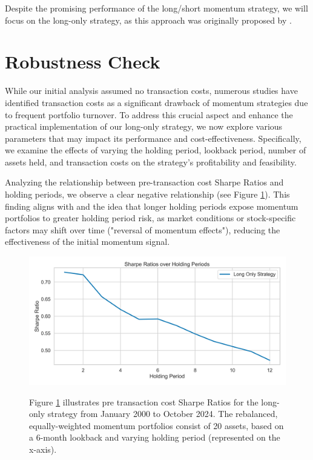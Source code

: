 \documentclass[a4paper,12pt]{article}
\begin{document}
Despite the promising performance of the long/short momentum strategy, we will focus on the long-only strategy, as this approach was originally proposed by \cite{jegatit1993}. 

\newpage


\section{Robustness Check}
While our initial analysis assumed no transaction costs, numerous studies have identified transaction costs as a significant drawback of momentum strategies due to frequent portfolio turnover. To address this crucial aspect and enhance the practical implementation of our long-only strategy, we now explore various parameters that may impact its performance and cost-effectiveness. Specifically, we examine the effects of varying the holding period, lookback period, number of assets held, and transaction costs on the strategy's profitability and feasibility.

Analyzing the relationship between pre-transaction cost Sharpe Ratios and holding periods, we observe a clear negative relationship (see Figure \ref{fig_02}). This finding aligns with \cite{jegatit1993} and the idea that longer holding periods expose momentum portfolios to greater holding period risk, as market conditions or stock-specific factors may shift over time ("reversal of momentum effects"), reducing the effectiveness of the initial momentum signal. 
\begin{figure}[htbp]
\centerline{\includegraphics[width=1\textwidth]{figures/rc_holding_period.png}}
\caption{}
\label{fig_02}
\small{{Figure \ref{fig_02} illustrates pre transaction cost Sharpe Ratios for the long-only strategy from January 2000 to October 2024. The rebalanced, equally-weighted momentum portfolios consist of 20 assets, based on a 6-month lookback and varying  holding period (represented on the x-axis).}}
\end{figure}
\end{document}
